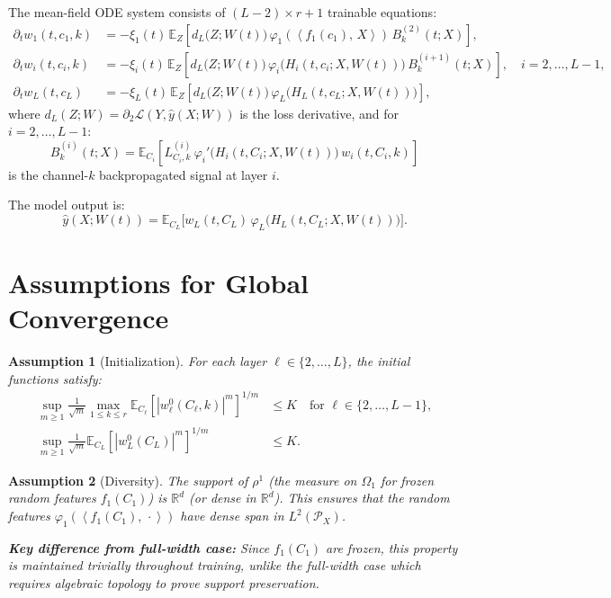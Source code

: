\documentclass[11pt]{article}
\newcommand{\E}{\mathbb{E}}
\newcommand{\R}{\mathbb{R}}
\newcommand{\1}{\mathbbm{1}}
\newcommand{\ip}[2]{\left\langle #1,\,#2 \right\rangle}
\newtheorem{assumption}{Assumption}
\begin{document}
The mean-field ODE system consists of $(L-2)\times r + 1$ trainable equations:
\begin{align}
\partial_t w_1(t,c_1,k) &= -\xi_1(t)\,\E_{Z}\!\left[d_L\big(Z;W(t)\big)\,\varphi_1\!\left(\ip{f_1(c_1)}{X}\right)\,B_k^{(2)}(t;X)\right], \label{eq:ode-w1}\\
\partial_t w_i(t,c_i,k) &= -\xi_i(t)\,\E_{Z}\!\left[d_L\big(Z;W(t)\big)\,\varphi_i\!\Big(H_i(t,c_i;X,W(t))\Big)\,B_k^{(i+1)}(t;X)\right], \quad i=2,\ldots,L-1, \label{eq:ode-wi}\\
\partial_t w_L(t,c_L) &= -\xi_L(t)\,\E_{Z}\!\left[d_L\big(Z;W(t)\big)\,\varphi_L\!\Big(H_L(t,c_L;X,W(t))\Big)\right], \label{eq:ode-wL}
\end{align}
where $d_L(Z;W)=\partial_2 \mathcal{L}(Y,\hat y(X;W))$ is the loss derivative, and for $i=2,\ldots,L-1$:
\[
B_k^{(i)}(t;X)=\E_{C_i}\!\left[L^{(i)}_{C_i,k}\,\varphi_i'\!\Big(H_i(t,C_i;X,W(t))\Big)\,w_i(t,C_i,k)\right]
\]
is the channel-$k$ backpropagated signal at layer $i$.

The model output is:
\[
\hat y(X;W(t)) = \E_{C_L}\big[w_L(t,C_L)\,\varphi_L\big(H_L(t,C_L;X,W(t))\big)\big].
\]

\section{Assumptions for Global Convergence}

\begin{assumption}[Initialization]\label{assump:init-lowrank}
For each layer $\ell\in\{2,\dots,L\}$, the initial functions satisfy:
\begin{align*}
\sup_{m\ge 1}\frac{1}{\sqrt{m}}\max_{1\le k\le r}\E_{C_\ell}\!\left[|w_\ell^0(C_\ell,k)|^m\right]^{1/m} &\le K \quad \text{for } \ell\in\{2,\dots,L-1\},\\
\sup_{m\ge 1}\frac{1}{\sqrt{m}}\E_{C_L}\!\left[|w_L^0(C_L)|^m\right]^{1/m} &\le K.
\end{align*}
\end{assumption}

\begin{assumption}[Diversity]\label{assump:diversity-lowrank}
The support of $\rho^1$ (the measure on $\Omega_1$ for frozen random features $f_1(C_1)$) is $\R^d$ (or dense in $\R^d$). This ensures that the random features $\varphi_1(\ip{f_1(C_1)}{\cdot})$ have dense span in $L^2(\mathcal{P}_X)$.

\textbf{Key difference from full-width case:} Since $f_1(C_1)$ are frozen, this property is maintained trivially throughout training, unlike the full-width case which requires algebraic topology to prove support preservation.
\end{assumption}
\end{document}
